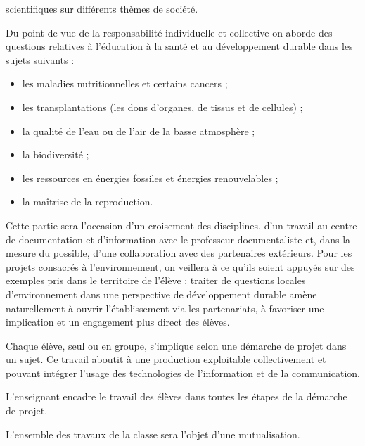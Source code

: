 \begin{itemize}
\begin{itemize}
scientifiques sur différents thèmes de société.
\end{itemize}
Du point de vue de la responsabilité individuelle et collective on
aborde des questions relatives à l’éducation à la santé et au
développement durable dans les sujets suivants :
\begin{itemize}
	\item les maladies nutritionnelles et certains cancers ;
	\item les transplantations (les dons d'organes, de tissus et de cellules) ;
	\item la qualité de l'eau ou de l'air de la basse atmosphère ;
	\item la biodiversité ;
	\item les ressources en énergies fossiles et énergies renouvelables ;
	\item la maîtrise de la reproduction.
\end{itemize}

Cette partie sera l'occasion d’un croisement des disciplines, d’un
travail au centre de documentation et d’information avec le
professeur documentaliste et, dans la mesure du possible, d’une
collaboration avec des partenaires extérieurs. Pour les projets
consacrés à l’environnement, on veillera à ce qu’ils soient appuyés
sur des exemples pris dans le territoire de l’élève ; traiter de
questions locales d’environnement dans une perspective de
développement durable amène naturellement à ouvrir
l’établissement via les partenariats, à favoriser une implication et
un engagement plus direct des élèves.

Chaque élève, seul ou en groupe, s’implique selon une démarche
de projet dans un sujet. Ce travail aboutit à une production
exploitable collectivement et pouvant intégrer l’usage des
technologies de l’information et de la communication.

L’enseignant encadre le travail des élèves dans toutes les étapes de
la démarche de projet.

L’ensemble des travaux de la classe sera l’objet d’une
mutualisation.
\end{itemize}

